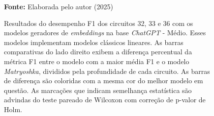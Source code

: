 \begin{figure}
\caption{Resultados do desempenho F1 dos circuitos 32, 33 e 36 com os modelos geradores de \textit{embeddings} na base \textit{ChatGPT} - Médio. Esses modelos implementam modelos clássicos lineares. As barras comparativas do lado direito exibem a diferença percentual da métrica F1 entre o modelo com a maior média F1 e o modelo \textit{Matryoshka}, divididos pela profundidade de cada circuito. As barras de diferença são coloridas com a mesma cor do melhor modelo em questão. As marcações que indicam semelhança estatística são advindas do teste pareado de Wilcoxon com correção de p-valor de Holm.}
\label{fig:model_transformer:medium:g4}
     \centering
    \centering

      \par\medskip\ABNTEXfontereduzida\selectfont\textbf{Fonte:} Elaborada pelo autor (2025) \par\medskip
\end{figure}